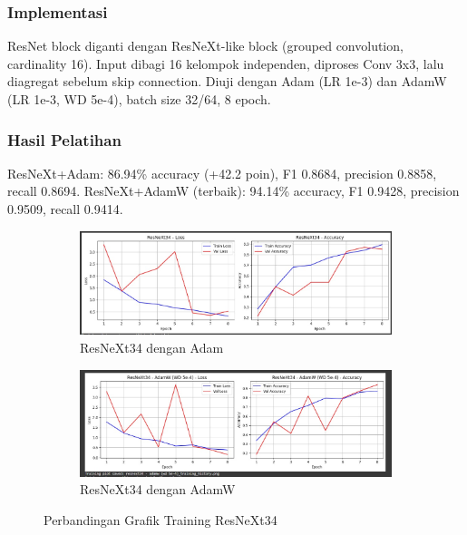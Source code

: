 \documentclass[11pt,a4paper]{article}
\begin{document}
\subsubsection{Implementasi}
ResNet block diganti dengan ResNeXt-like block (grouped convolution, cardinality 16). Input dibagi 16 kelompok independen, diproses Conv 3x3, lalu diagregat sebelum skip connection. Diuji dengan Adam (LR 1e-3) dan AdamW (LR 1e-3, WD 5e-4), batch size 32/64, 8 epoch.

\subsubsection{Hasil Pelatihan}
ResNeXt+Adam: 86.94\% accuracy (+42.2 poin), F1 0.8684, precision 0.8858, recall 0.8694. ResNeXt+AdamW (terbaik): 94.14\% accuracy, F1 0.9428, precision 0.9509, recall 0.9414. 

\begin{figure}[h]
\centering
\begin{subfigure}{0.49\textwidth}
\includegraphics[width=\textwidth]{Figure/tahap-3-resnext34.jpg}
\caption{ResNeXt34 dengan Adam}
\label{fig:resnext34-adam}
\end{subfigure}
\hfill
\begin{subfigure}{0.49\textwidth}
\includegraphics[width=\textwidth]{Figure/tahap-3-resnext34-adamw.jpg}
\caption{ResNeXt34 dengan AdamW}
\label{fig:resnext34-adamw}
\end{subfigure}
\caption{Perbandingan Grafik Training ResNeXt34}
\label{fig:resnext34-comparison}
\end{figure}
\end{document}
